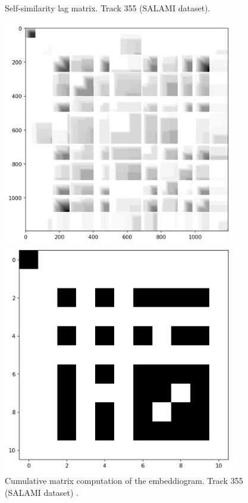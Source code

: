 \begin{figure}[ht]
\begin{minipage}{0.45\textwidth}
        \caption[Track 355 (SALAMI dataset) SSLM computation of the embeddiogram]{Self-similarity lag matrix. Track 355 (SALAMI dataset).}
        \label{fig:SSLM}
    \end{minipage}
    \vfill
    \begin{minipage}{0.45\textwidth}
        \centering
        \includegraphics[width=0.9\textwidth]{figures/images/355cumulativematrix.png} %
        \caption[Track 355 (SALAMI dataset). Q-matrix]{Cumulative matrix computation of the embeddiogram. Track 355 (SALAMI dataset) .}
        \label{fig:Q}
    \end{minipage}\hfill
    \begin{minipage}{0.45\textwidth}
        \centering
        \includegraphics[width=0.9\textwidth]{figures/images/355transitivebinarysimilaritymatrix.png} %

\end{minipage}
\end{figure}
